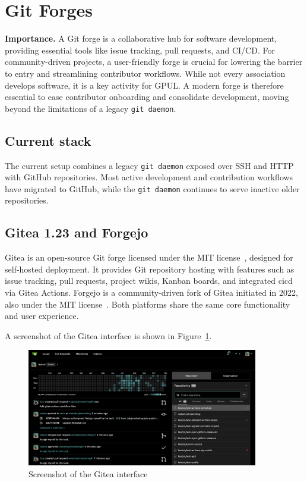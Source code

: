 \section{Git Forges}

\textbf{Importance.} A Git forge is a collaborative hub for software development, providing essential tools like issue tracking, pull requests, and CI/CD. For community-driven projects, a user-friendly forge is crucial for lowering the barrier to entry and streamlining contributor workflows. While not every association develops software, it is a key activity for GPUL. A modern forge is therefore essential to ease contributor onboarding and consolidate development, moving beyond the limitations of a legacy \texttt{git daemon}.

\subsection*{Current stack}
The current setup combines a legacy \verb|git daemon| exposed over SSH and HTTP with GitHub repositories. Most active development and contribution workflows have migrated to GitHub, while the \texttt{git daemon} continues to serve inactive older repositories.

\subsection*{Gitea 1.23 and Forgejo}

Gitea is an open-source Git forge licensed under the MIT license~\cite{gitea-docs}, designed for self-hosted deployment. It provides Git repository hosting with features such as issue tracking, pull requests, project wikis, Kanban boards, and integrated \gls{cicd} via Gitea Actions. Forgejo is a community-driven fork of Gitea initiated in 2022, also under the MIT license~\cite{forgejo-docs}. Both platforms share the same core functionality and user experience.

A screenshot of the Gitea interface is shown in Figure~\ref{fig:gitea-ui}.

\begin{figure}[H]
  \centering
  \includegraphics[width=0.9\textwidth]{imaxes/gitea-ui.png}
  \caption{Screenshot of the Gitea interface}
  \label{fig:gitea-ui}
\end{figure}

